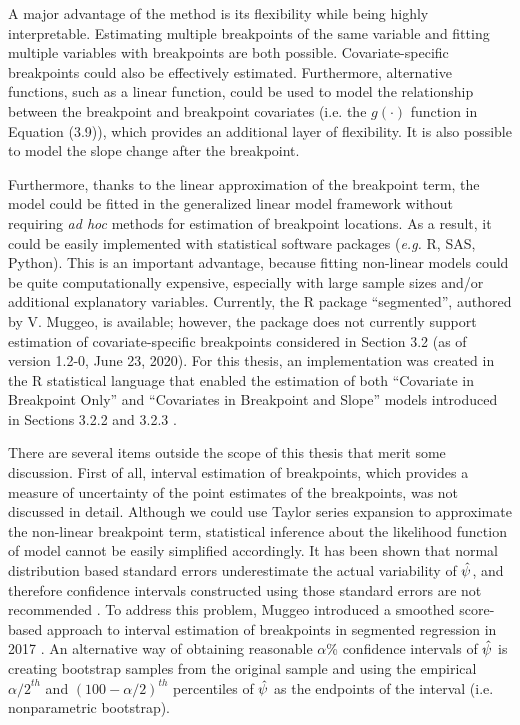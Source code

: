 \documentclass [12pt, proquest] {uwthesis}[2016/11/22]
\begin{document}
A major advantage of the method is its flexibility while being highly interpretable. Estimating multiple breakpoints of the same variable and fitting multiple variables with breakpoints are both possible. Covariate-specific breakpoints could also be effectively estimated. Furthermore, alternative functions, such as a linear function, could be used to model the relationship between the breakpoint and breakpoint covariates (i.e. the $g(\cdot)$ function in Equation (3.9)), which provides an additional layer of flexibility. It is also possible to model the slope change after the breakpoint.

Furthermore, thanks to the linear approximation of the breakpoint term, the model could be fitted in the generalized linear model framework without requiring \textit{ad hoc} methods for estimation of breakpoint locations. As a result, it could be easily implemented with statistical software packages (\textit{e.g.} R, SAS, Python). This is an important advantage, because fitting non-linear models could be quite computationally expensive, especially with large sample sizes and/or additional explanatory variables. Currently, the R package ``segmented'', authored by V. Muggeo, is available; however, the package does not currently support estimation of covariate-specific breakpoints considered in Section 3.2 (as of version 1.2-0, June 23, 2020). For this thesis, an implementation was created in the R statistical language that enabled the estimation of both ``Covariate in Breakpoint Only'' and ``Covariates in Breakpoint and Slope'' models introduced in Sections 3.2.2 and 3.2.3 \cite{R}.

There are several items outside the scope of this thesis that merit some discussion. First of all, interval estimation of breakpoints, which provides a measure of uncertainty of the point estimates of the breakpoints, was not discussed in detail. Although we could use Taylor series expansion to approximate the non-linear breakpoint term, statistical inference about the likelihood function of model cannot be easily simplified accordingly. It has been shown that normal distribution based standard errors underestimate the actual variability of $\Hat{\psi}$, and therefore confidence intervals constructed using those standard errors are not recommended \cite{VM2017}. To address this problem, Muggeo introduced a smoothed score-based approach to interval estimation of breakpoints in segmented regression in 2017 \cite{VM2017}. An alternative way of obtaining reasonable $\alpha$\% confidence intervals of $\Hat{\psi}$ is creating bootstrap samples from the original sample and using the empirical ${\alpha/2}^{th}$ and $(100 - \alpha/2)^{th}$ percentiles of $\Hat{\psi}$ as the endpoints of the interval (i.e. nonparametric bootstrap).
\end{document}
